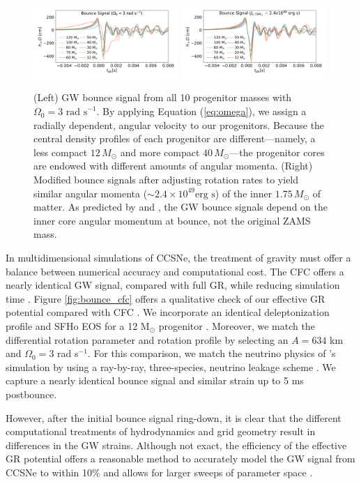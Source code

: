 \documentclass[twocolumn,times]{aastex62}  %
\newcommand{\Msun}{\ensuremath{\mathrm{M}_\odot}\xspace}
\begin{document}
\begin{figure}[t]
  \centering     %
  \includegraphics[width=0.49\textwidth]{hd3_bounce_test.pdf}
  \includegraphics[width=0.49\textwidth]{hdj_bounce_final.pdf}
  \caption{(Left) GW bounce signal from all 10 progenitor masses with $\Omega_0 = 3 \text{ rad s}^{-1}$.  By applying Equation (\ref{eq:omega}), we assign a radially dependent, angular velocity to our progenitors.  Because the central density profiles of each progenitor are different---namely, a less compact $12\,M_\odot$ and more compact $40\,M_\odot$---the progenitor cores are endowed with different amounts of angular momenta.   (Right) Modified bounce signals after adjusting rotation rates to yield similar angular momenta ($\sim 2.4\times10^{49} \text{erg s}$) of the inner $1.75\,M_\odot$ of matter.  As predicted by \citet{dimm:2008} and \citet{abdik:2010,abdik:2014}, the GW bounce signals depend on the inner core angular momentum at bounce, not the original ZAMS mass.}
  \label{fig:bounce}
\end{figure}

In multidimensional simulations of CCSNe, the treatment of gravity must offer a balance between numerical accuracy and computational cost.   The CFC offers a nearly identical GW signal, compared with full GR, while reducing simulation time \citep{ott:2007}.  Figure \ref{fig:bounce_cfc} offers a qualitative check of our effective GR potential compared with CFC \citep{richers:2017}.  We incorporate an identical deleptonization profile \citep{lieb:2005} and SFHo EOS \citep{steiner:2013} for a 12 \Msun progenitor \citep{woosley:2007}.  Moreover, we match the differential rotation parameter and rotation profile by selecting an $A = 634$ km and $\Omega_0 = 3$ rad s$^{-1}$.  For this comparison, we match the neutrino physics of \citet{richers:2017}'s simulation by using a ray-by-ray, three-species, neutrino leakage scheme \citep{oconnor:2010,couch:2014}.  We capture a nearly identical bounce signal and similar strain up to 5 ms postbounce. \par
However, after the initial bounce signal ring-down, it is clear that the different computational treatments of hydrodynamics and grid geometry result in differences in the GW strains.  Although not exact, the efficiency of the effective GR potential offers a reasonable method to accurately model the GW signal from CCSNe to within 10\% and allows for larger sweeps of parameter space \citep{muller:2013}.
\end{document}
